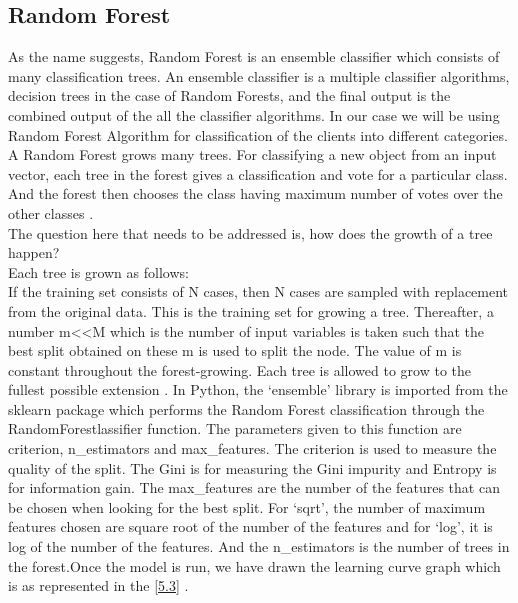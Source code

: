 \subsection{Random Forest} 
As the name suggests, Random Forest is an ensemble classifier which consists of many classification trees. An ensemble classifier is a multiple classifier algorithms, decision trees in the case of Random Forests, and the final output is the combined output of the all the classifier algorithms. In our case we will be using Random Forest Algorithm for classification of the clients into different categories. A Random Forest grows many trees. For classifying a new object from an input vector, each tree in the forest gives a classification and vote for a particular class. And the forest then chooses the class having maximum number of votes over the other classes \cite{link13}.\\
The question here that needs to be addressed is, how does the growth of a tree happen?\\
Each tree is grown as follows:\\
If the training set consists of N cases, then N cases are sampled with replacement from the original data. This is the training set for growing a tree. Thereafter, a number m<<M which is the number of input variables is taken such that the best split obtained on these m is used to split the node. The value of m is constant throughout the forest-growing. Each tree is allowed to grow to the fullest possible extension \cite{link13}.
In Python, the `ensemble' library is imported from the sklearn package which performs the Random Forest classification through the RandomForestlassifier function. The parameters given to this function are criterion, n\_estimators and max\_features. The criterion is used to measure the quality of the split. The Gini is for measuring the Gini impurity and Entropy is for information gain. The max\_features are the number of the features that can be chosen when looking for the best split. For `sqrt', the number of maximum features chosen are square root of the number of the features and for `log', it is log of the number of the features. And the n\_estimators is the number of trees in the forest.Once the model is run, we have drawn the learning curve graph which is as represented in the \ref{5.3} .

